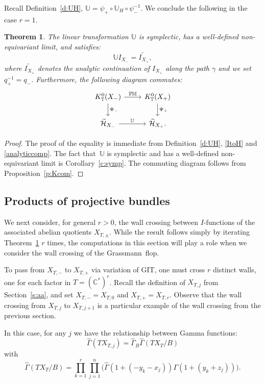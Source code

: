 \documentclass[11pt]{article}
\numberwithin{equation}{section}
\newtheorem{Theorem}{Theorem}[section]
\numberwithin{equation}{section}
\newcommand{\cc}[1]{\mathcal{#1}} %
\newcommand{\CC}{\mathbb{C}}
\newcommand{\UU}{\mathbb{U}}
\newcommand{\torus}{\mathbb{T}}
\newcommand{\FM}{\mathbb{FM}}
\newcommand{\z}{z}
\newcommand{\x}{x}
\begin{document}
Recall Definition~\ref{d:UH}, $\UU = \psi_{+} \circ \UU_H \circ \psi_{-}^{-1}.$ We conclude the following in the case $r=1.$
\begin{Theorem} \label{t:st}
The linear transformation $\UU$ is symplectic, has a well-defined non-equivariant limit, and satisfies:
\[
\UU I_{X_{-}} =\widetilde{I_{X_{+}}},
\]
where $\widetilde{I_{X_{+}}}$ denotes the analytic continuation of $I_{X_{+}}$ along the path $\gamma$ and we set $q_+^{-1} = q_-$.
Furthermore, the following diagram commutes:
\[
\begin{tikzcd}
K^0_\torus(X_{-}) \ar[r, "\FM"] \ar[d, "\Psi_-"] & K^0_\torus(X_{+}) \ar[d, "\Psi_+"] \\
\widetilde{\cc H}_{X_{-}} \ar[r, "\UU"] & \widetilde{\cc H}_{X_{+}}.
\end{tikzcd}
\]
\end{Theorem}



\begin{proof}
The proof of the equality is immediate from Definition~\ref{d:UH}, \eqref{ItoH} and \eqref{analyticcomp}. The fact that~$\UU$ is symplectic and has a well-defined non-equivariant limit is Corollary~\ref{c:symp}. The commuting diagram follows from Proposition~\ref{p:Kcom}.
\end{proof}

\subsection{Products of projective bundles}
We next consider, for general $r >0$, the wall crossing between $I$-functions of the associated abelian quotients $X_{T, \pm}$. While the result follows simply by iterating Theorem~\ref{t:st} $r$ times, the computations in this section will play a role when we consider the wall crossing of the Grassmann~flop.

To pass from $X_{T, -}$ to $X_{T, +}$ via variation of GIT, one must cross $r$ distinct walls, one for each factor in $T = (\CC^*)^r$.
Recall the definition of $X_{T, j}$ from Section~\ref{s:aa}, and set $X_{T, -} = X_{T, 0}$ and $X_{T, +} = X_{T, r}$.
Observe that the wall crossing from $X_{T, j}$ to $X_{T, j+1}$ is a particular example of the wall crossing from the previous section.

In this case, for any $j$ we have the relationship between Gamma functions:
\[
\hat \Gamma(TX_{T, j})=
\hat \Gamma_{B} \hat \Gamma(TX_T/B)
\]
with
\[
\hat \Gamma(TX_T/B) = \prod_{k=1}^r\prod_{j=1}^n\bigl(
\hat \Gamma(1+(- y_k-\x_j))\Gamma(1+(y_k+\z_j))\bigr).
\]
\end{document}
